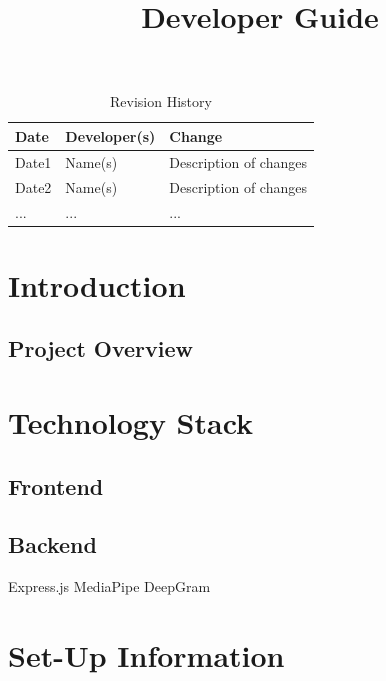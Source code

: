 \documentclass{article}
\title{Developer Guide\\\progname}
\author{\authname}
\date{}
\begin{document}
\maketitle
\newpage

\begin{table}[h!]
\caption{Revision History} \label{TblRevisionHistory}
\begin{tabularx}{\textwidth}{llX}
\toprule
\textbf{Date} & \textbf{Developer(s)} & \textbf{Change}\\
\midrule
Date1 & Name(s) & Description of changes\\
Date2 & Name(s) & Description of changes\\
... & ... & ...\\
\bottomrule
\end{tabularx}
\end{table}

\newpage


\tableofcontents

\section{Introduction}
\subsection{Project Overview}

\section{Technology Stack}
\subsection{Frontend}
\subsection{Backend}
Express.js 
MediaPipe 
DeepGram


\section{Set-Up Information}
\end{document}
